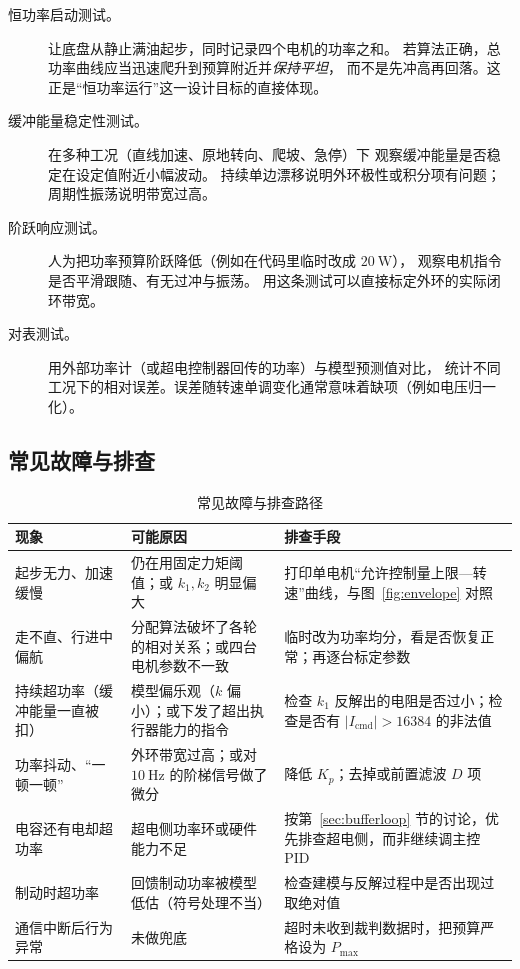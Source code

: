 \documentclass[cn,blue,11pt,device=normal]{elegantnote}
\newcommand{\Icmd}{I_{\mathrm{cmd}}{}}
\newcommand{\Pmax}{P_{\max}{}}
\begin{document}
\begin{description}
  \item[恒功率启动测试。] 让底盘从静止满油起步，同时记录四个电机的功率之和。
  若算法正确，总功率曲线应当迅速爬升到预算附近并\emph{保持平坦}，
  而不是先冲高再回落。这正是“恒功率运行”这一设计目标的直接体现。
  \item[缓冲能量稳定性测试。] 在多种工况（直线加速、原地转向、爬坡、急停）下
  观察缓冲能量是否稳定在设定值附近小幅波动。
  持续单边漂移说明外环极性或积分项有问题；周期性振荡说明带宽过高。
  \item[阶跃响应测试。] 人为把功率预算阶跃降低（例如在代码里临时改成 $20\ \mathrm{W}$），
  观察电机指令是否平滑跟随、有无过冲与振荡。
  用这条测试可以直接标定外环的实际闭环带宽。
  \item[对表测试。] 用外部功率计（或超电控制器回传的功率）与模型预测值对比，
  统计不同工况下的相对误差。误差随转速单调变化通常意味着缺项（例如电压归一化）。
\end{description}

\subsection{常见故障与排查}

\begin{table}[htbp]
  \centering
  \small
  \caption{常见故障与排查路径}
  \label{tab:trouble}
  \begin{tabular}{@{}>{\raggedright\arraybackslash}p{}>{\raggedright\arraybackslash}p{}>{\raggedright\arraybackslash}p{}@{}}
    \toprule
    现象 & 可能原因 & 排查手段 \\
    \midrule
    起步无力、加速缓慢 &
    仍在用固定力矩阈值；或 $k_1,k_2$ 明显偏大 &
    打印单电机“允许控制量上限—转速”曲线，与图~\ref{fig:envelope} 对照 \\[4pt]
    走不直、行进中偏航 &
    分配算法破坏了各轮的相对关系；或四台电机参数不一致 &
    临时改为功率均分，看是否恢复正常；再逐台标定参数 \\[4pt]
    持续超功率（缓冲能量一直被扣） &
    模型偏乐观（$k$ 偏小）；或下发了超出执行器能力的指令 &
    检查 $k_1$ 反解出的电阻是否过小；检查是否有 $|\Icmd|>16384$ 的非法值 \\[4pt]
    功率抖动、“一顿一顿” &
    外环带宽过高；或对 $10\ \mathrm{Hz}$ 的阶梯信号做了微分 &
    降低 $K_p$；去掉或前置滤波 $D$ 项 \\[4pt]
    电容还有电却超功率 &
    超电侧功率环或硬件能力不足 &
    按第~\ref{sec:bufferloop} 节的讨论，优先排查超电侧，而非继续调主控 PID \\[4pt]
    制动时超功率 &
    回馈制动功率被模型低估（符号处理不当） &
    检查建模与反解过程中是否出现过取绝对值 \\[4pt]
    通信中断后行为异常 &
    未做兜底 &
    超时未收到裁判数据时，把预算严格设为 $\Pmax$ \\
    \bottomrule
  \end{tabular}
\end{table}
\end{document}
